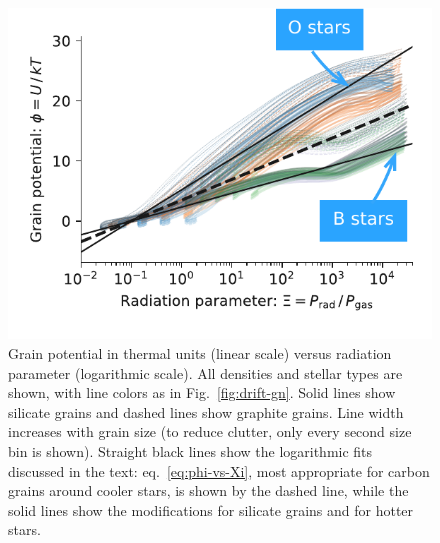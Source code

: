 \begin{figure}
  \centering
  \includegraphics[width=\linewidth]{figs/phi-versus-xi-annotate}
  \caption{Grain potential in thermal units (linear scale) versus
    radiation parameter (logarithmic scale). All densities and stellar
    types are shown, with line colors as in Fig.~\ref{fig:drift-gn}.
    Solid lines show silicate grains and dashed lines show graphite
    grains.  Line width increases with grain size (to reduce clutter,
    only every second size bin is shown).  Straight black lines show
    the logarithmic fits discussed in the text:
    eq.~\eqref{eq:phi-vs-Xi}, most appropriate for carbon grains
    around cooler stars, is shown by the dashed line, while the solid
    lines show the modifications for silicate grains and for hotter
    stars.}
  \label{fig:phi-vs-Xi}
\end{figure}

